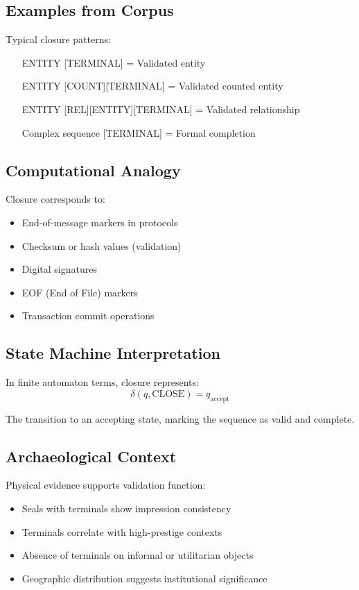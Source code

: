 \subsection{Examples from Corpus}

Typical closure patterns:
\begin{itemize}
    \item [ENTITY][TERMINAL] = Validated entity
    \item [ENTITY][COUNT][TERMINAL] = Validated counted entity
    \item [ENTITY][REL][ENTITY][TERMINAL] = Validated relationship
    \item [Complex sequence][TERMINAL] = Formal completion
\end{itemize}

\subsection{Computational Analogy}

Closure corresponds to:
\begin{itemize}
    \item End-of-message markers in protocols
    \item Checksum or hash values (validation)
    \item Digital signatures
    \item EOF (End of File) markers
    \item Transaction commit operations
\end{itemize}

\subsection{State Machine Interpretation}

In finite automaton terms, closure represents:
\[
\delta(q, \text{CLOSE}) = q_{\text{accept}}
\]

The transition to an accepting state, marking the sequence as valid and complete.

\subsection{Archaeological Context}

Physical evidence supports validation function:
\begin{itemize}
    \item Seals with terminals show impression consistency
    \item Terminals correlate with high-prestige contexts
    \item Absence of terminals on informal or utilitarian objects
    \item Geographic distribution suggests institutional significance
\end{itemize}
